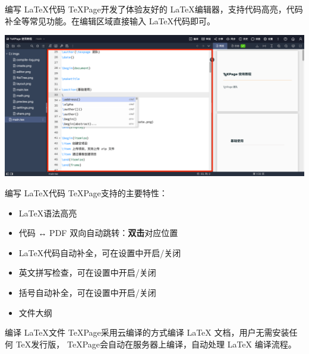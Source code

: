 \documentclass{beamer}
\DeclareRobustCommand\texpage{\TeX Page}
\newenvironment{display}{\trivlist\item[]}{\endtrivlist}
\begin{document}
\begin{frame}{编写 \LaTeX 代码}
\texpage 开发了体验友好的 \LaTeX 编辑器，支持代码高亮，代码补全等常见功能。在编辑区域直接输入 \LaTeX 代码即可。

\begin{display}
\includegraphics[width=\textwidth]{imgs/editor.png}
\end{display}
\end{frame}



\begin{frame}{编写 \LaTeX 代码}
\texpage 支持的主要特性：

\begin{itemize}
\item \LaTeX 语法高亮
\item 代码 ↔ PDF 双向自动跳转：\textbf{双击}对应位置
\item \LaTeX 代码自动补全，可在设置中开启/关闭
\item 英文拼写检查，可在设置中开启/关闭
\item 括号自动补全，可在设置中开启/关闭
\item 文件大纲
\end{itemize}
\end{frame}



\begin{frame}{编译 \LaTeX 文件}
\texpage 采用云编译的方式编译 LaTeX 文档，用户无需安装任何 \TeX 发行版，
\texpage 会自动在服务器上编译，自动处理 LaTeX 编译流程。

\end{frame}
\end{document}
